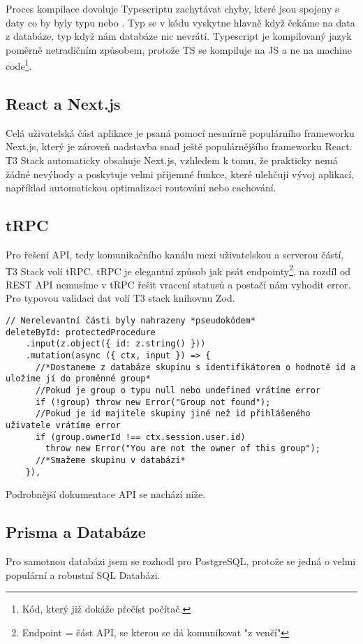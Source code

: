 Proces kompilace dovoluje Typescriptu zachytávat chyby, které jsou spojeny s daty co by byly typu  nebo . Typ  se v kódu vyskytne hlavně když čekáme na data z databáze, typ  když nám databáze nic nevrátí.
Typescript je kompilovaný jazyk poměrně netradičním způsobem, protože TS se kompiluje na JS a ne na machine code\footnote{Kód, který již dokáže přečíst počítač.}.

\subsection{React a Next.js}

Celá uživatelská část aplikace je psaná pomocí nesmírně populárního frameworku Next.js, který je zároveň nadstavba snad ještě populárnějšího frameworku React. T3 Stack automaticky obsahuje Next.js, vzhledem k tomu, že prakticky nemá žádné nevýhody a poskytuje velmi příjemné funkce, které ulehčují vývoj aplikací, například automatickou optimalizaci routování nebo cachování\cite{vercel}.

\subsection{tRPC}
Pro řešení API, tedy komunikačního kanálu mezi uživatelskou a serverou částí, T3 Stack volí tRPC. tRPC je elegantní způsob jak psát endpointy\footnote{Endpoint = část API, se kterou se dá komunikovat "z venčí"}, na rozdíl od REST API nemusíme v tRPC řešit vracení statusů a postačí nám vyhodit error. Pro typovou validaci dat volí T3 stack knihovnu Zod\cite{zod}.
\begin{lstlisting}[caption={Úryvek z "groups" routeru zobrazující mazání skupiny}]
// Nerelevantní části byly nahrazeny *pseudokódem*
deleteById: protectedProcedure
    .input(z.object({ id: z.string() }))
    .mutation(async ({ ctx, input }) => {
      //*Dostaneme z databáze skupinu s identifikátorem o hodnotě id a uložíme jí do proměnné group*
      //Pokud je group o typu null nebo undefined vrátíme error
      if (!group) throw new Error("Group not found");
      //Pokud je id majitele skupiny jiné než id přihlášeného uživatele vrátíme error
      if (group.ownerId !== ctx.session.user.id)
        throw new Error("You are not the owner of this group");
      //*Smažeme skupinu v databázi*
    }),
\end{lstlisting}
Podrobnější dokumentace API se nachází níže.

\subsection{Prisma a Databáze}
Pro samotnou databázi jsem se rozhodl pro PostgreSQL, protože se jedná o velmi populární a robustní SQL Databázi.

